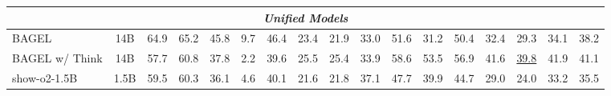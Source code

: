 \begin{table}[t]
{\begin{tabular}{lcccccccccccccccc}
\multicolumn{17}{c}{\textit{\textbf{Unified Models}}}                                                                                                                                                                                                                                                                                                                                                                                                                                                                                                                                                                                                                                                                          \\ \midrule
BAGEL                            & 14B                                & 64.9                                 & 65.2                                 & 45.8                                 & 9.7                                  & \cellcolor[HTML]{E2E2E2}46.4                                 & 23.4                                 & 21.9                                 & 33.0                                 & 51.6                                 & 31.2                                 & 50.4                                 & 32.4                                 & 29.3                                 & \cellcolor[HTML]{E2E2E2}34.1                                 & 38.2                                 \\
BAGEL w/ Think                   & 14B                                & 57.7                                 & 60.8                                 & 37.8                                 & 2.2                                  & \cellcolor[HTML]{E2E2E2}39.6                                 & 25.5                                 & 25.4                                 & 33.9                                 & 58.6                                 & 53.5                                 & 56.9                                 & 41.6                                 & {\color[HTML]{F88825} \underline{39.8}}    & \cellcolor[HTML]{E2E2E2}41.9                                 & 41.1                                 \\
show-o2-1.5B                     & 1.5B                               & 59.5                                 & 60.3                                 & 36.1                                 & 4.6                                  & \cellcolor[HTML]{E2E2E2}40.1                                 & 21.6                                 & 21.8                                 & 37.1                                 & 47.7                                 & 39.9                                 & 44.7                                 & 29.0                                 & 24.0                                 & \cellcolor[HTML]{E2E2E2}33.2                                 & 35.5                                 \\

\end{tabular}}
\end{table}
